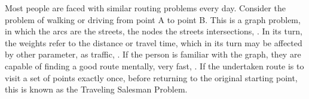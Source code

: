 Most people are faced with similar routing problems every day. 
Consider the problem of walking or driving from point A to point B. This is a graph problem, in which the arcs are the streets, the nodes the streets intersections, \cite{cite_11}. 
In its turn, the weights refer to the distance or travel time, which in its turn may be affected by other parameter, as traffic, \cite{cite_12}. 
If the person is familiar with the graph, they are capable of finding a good route mentally, very fast, \cite{cite_13}. 
If the undertaken route is to visit a set of points exactly once, before returning to the original starting point, this is known as the Traveling Salesman Problem. 